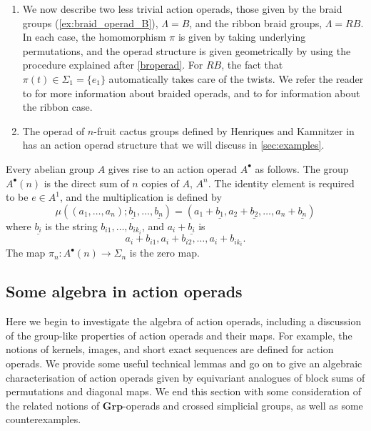 \begin{example}
\begin{enumerate}
\item We now describe two less trivial action operads, those given by the braid groups (\cref{ex:braid_operad_B}), $\Lambda = B$, and the ribbon braid groups, $\Lambda = RB$. In each case, the homomorphism $\pi$ is given by taking underlying permutations, and the operad structure is given geometrically by using the procedure explained after \cref{broperad}. For $RB$, the fact that $\pi(t) \in \Sigma_1 = \{e_1\}$ automatically takes care of the twists. We refer the reader to \cite{fie-br} for more information about braided operads, and to \cite{sal-wahl, wahl-thesis} for information about the ribbon case.
\item The operad of $n$-fruit cactus groups defined by Henriques and Kamnitzer in \cite{hk-cobound} has an action operad structure that we will discuss in \cref{sec:examples}.
\end{enumerate}
\end{example}

\begin{example}
Every abelian group $A$ gives rise to an action operad $A^{\bullet}$ as follows. The group $A^{\bullet}(n)$ is the direct sum of $n$ copies of $A$, $A^{n}$. The identity element is required to be $e \in A^{1}$, and the multiplication is defined by
  \[
    \mu((a_{1}, \ldots, a_{n}); \underline{b_1}, \ldots, \underline{b_n}) = (a_{1}+\underline{b_{1}}, a_{2} + \underline{b_{2}}, \ldots, a_{n} + \underline{b_{n}})
  \]
where $\underline{b_{i}}$ is the string $b_{i1}, \ldots, b_{ik_{i}}$, and $a_{i} + \underline{b_{i}}$ is
  \[
    a_{i} + b_{i1}, a_{i} + b_{i2}, \ldots, a_{i} + b_{ik_{i}}.
  \]
The map $\pi_n \colon A^\bullet(n) \rightarrow \Sigma_n$ is the zero map. 
\end{example}




\subsection{Some algebra in action operads}
Here we begin to investigate the algebra of action operads, including a discussion of the group-like properties of action operads and their maps. For example, the notions of kernels, images, and short exact sequences are defined for action operads. We provide some useful technical lemmas and go on to give an algebraic characterisation of action operads given by equivariant analogues of block sums of permutations and diagonal maps. We end this section with some consideration of the related notions of $\textbf{Grp}$-operads and crossed simplicial groups, as well as some counterexamples.

